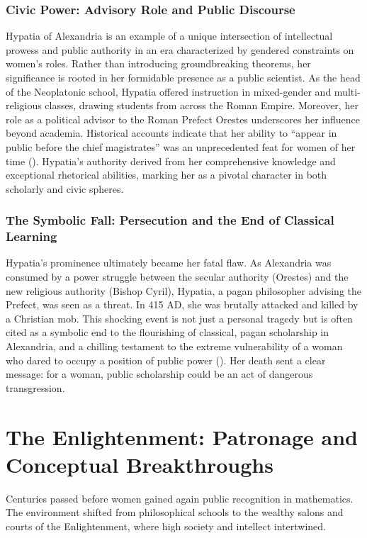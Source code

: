 \subsubsection{Civic Power: Advisory Role and Public Discourse}
Hypatia of Alexandria is an example of a unique intersection of intellectual prowess and public authority in an era characterized by gendered constraints on women's roles. Rather than introducing groundbreaking theorems, her significance is rooted in her formidable presence as a public scientist. As the head of the Neoplatonic school, Hypatia offered instruction in mixed-gender and multi-religious classes, drawing students from across the Roman Empire. Moreover, her role as a political advisor to the Roman Prefect Orestes underscores her influence beyond academia. Historical accounts indicate that her ability to ``appear in public before the chief magistrates'' was an unprecedented feat for women of her time (\cite{Osen1974}). Hypatia's authority derived from her comprehensive knowledge and exceptional rhetorical abilities, marking her as a pivotal character in both scholarly and civic spheres.
\subsubsection{The Symbolic Fall: Persecution and the End of Classical Learning}
Hypatia's prominence ultimately became her fatal flaw. As Alexandria was consumed by a power struggle between the secular authority (Orestes) and the new religious authority (Bishop Cyril), Hypatia, a pagan philosopher advising the Prefect, was seen as a threat. In 415 AD, she was brutally attacked and killed by a Christian mob. This shocking event is not just a personal tragedy but is often cited as a symbolic end to the flourishing of classical, pagan scholarship in Alexandria, and a chilling testament to the extreme vulnerability of a woman who dared to occupy a position of public power (\cite{Dzielska1995}). Her death sent a clear message: for a woman, public scholarship could be an act of dangerous transgression.

\section{The Enlightenment: Patronage and Conceptual Breakthroughs}
Centuries passed before women gained again public recognition in mathematics. The environment shifted from philosophical schools to the wealthy salons and courts of the Enlightenment, where high society and intellect intertwined.
